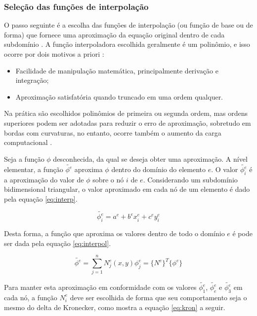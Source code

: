 \documentclass[
    12pt,               %
    openright,          %
    oneside,
    a4paper,            %
    english,            %
    french,             %
    spanish,            %
    brazil              %
    ]{abntex2}
\begin{document}
\subsubsection*{Seleção das funções de interpolação}
\label{sec:interp}
O passo seguinte é a escolha das funções de interpolação (ou função de base ou de forma) \cite{huebner} que fornece uma aproximação da equação original dentro de cada subdomínio \cite{jin}. 
A função interpoladora escolhida geralmente é um polinômio, e isso ocorre por dois motivos a priori \cite{desai}:

\begin{itemize}  
	\item Facilidade de manipulação matemática, principalmente derivação e integração;
	\item Aproximação satisfatória quando truncado em uma ordem qualquer.
\end{itemize}

Na prática são escolhidos polinômios de primeira ou segunda ordem, mas ordens superiores podem ser adotadas para reduzir o erro de aproximação, sobretudo em bordas com curvaturas, no entanto, ocorre também o aumento da carga computacional \cite{jin}.

Seja a função $\phi$ desconhecida, da qual se deseja obter uma aproximação. A nível elementar, a função $\tilde{\phi^e}$ aproxima $\phi$ dentro do domínio do elemento $e$. O valor $\tilde{\phi^{e}_i}$  é a aproximação do valor de $\phi$ sobre o nó $i$ de $e$. Considerando um subdomínio bidimensional triangular, o valor aproximado em cada nó de um elemento é dado pela equação \ref{eq:interp}.

\begin{equation}
\label{eq:interp}
\tilde{\phi^e_i} = a^e + b^e x^e_i + c^e y^e_i
\end{equation}

Desta forma, a função que aproxima os valores dentro de todo o domínio $e$ é pode ser dada pela equação \ref{eq:interpol}.

\begin{equation}
\label{eq:interpol}
\tilde{\phi^e} = \sum_{j=1}^{n}{N_j^e (x, y) \phi_j^e} = 
\{N^e\}^T \{\phi^e\}
\end{equation}

Para manter esta aproximação em conformidade com os valores $\tilde{\phi^e_1}$, $\tilde{\phi^e_e}$ e $\tilde{\phi^e_3}$ em cada nó, a função $N_i^e$ deve ser escolhida de forma que seu comportamento seja o mesmo do delta de Kronecker, como mostra a equação \ref{eq:kron} a seguir.
\end{document}

